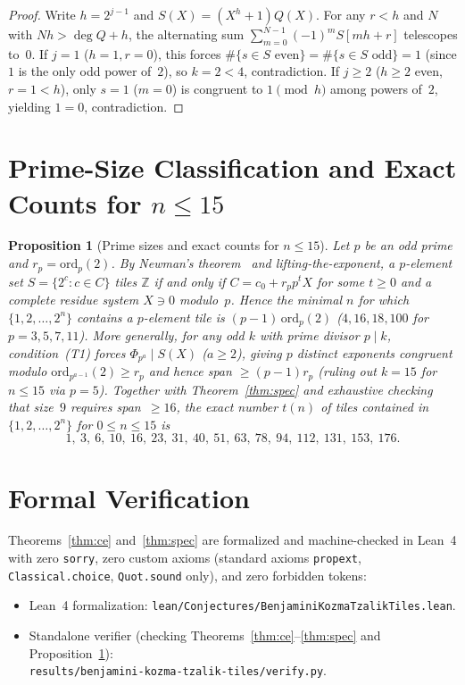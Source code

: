 \documentclass[11pt]{article}
\newtheorem{proposition}{Proposition}
\begin{document}
\begin{proof}
Write $h = 2^{j-1}$ and $S(X) = (X^h + 1) Q(X)$. For any $r < h$ and $N$ with $Nh > \deg Q + h$, the alternating sum $\sum_{m=0}^{N-1} (-1)^m S[mh + r]$ telescopes to~$0$. If $j = 1$ ($h = 1, r = 0$), this forces $\#\{s \in S \text{ even}\} = \#\{s \in S \text{ odd}\} = 1$ (since $1$ is the only odd power of~$2$), so $k = 2 < 4$, contradiction. If $j \ge 2$ ($h \ge 2$ even, $r = 1 < h$), only $s = 1$ ($m = 0$) is congruent to $1 \pmod{h}$ among powers of~$2$, yielding $1 = 0$, contradiction.
\end{proof}

\section{Prime-Size Classification and Exact Counts for \texorpdfstring{$n \le 15$}{n <= 15}}

\begin{proposition}[Prime sizes and exact counts for $n \le 15$]\label{prop:prime}
Let $p$ be an odd prime and $r_p = \mathrm{ord}_p(2)$. By Newman's theorem~\cite{Newman1977} and lifting-the-exponent, a $p$-element set $S = \{2^c : c \in C\}$ tiles $\mathbb{Z}$ if and only if $C = c_0 + r_p p^t X$ for some $t \ge 0$ and a complete residue system $X \ni 0$ modulo~$p$. Hence the minimal $n$ for which $\{1, 2, \dots, 2^n\}$ contains a $p$-element tile is $(p - 1)\,\mathrm{ord}_p(2)$ ($4, 16, 18, 100$ for $p = 3, 5, 7, 11$). More generally, for any odd $k$ with prime divisor $p \mid k$, condition~(T1) forces $\Phi_{p^a} \mid S(X)$ ($a \ge 2$), giving $p$ distinct exponents congruent modulo $\mathrm{ord}_{p^{a-1}}(2) \ge r_p$ and hence span $\ge (p - 1) r_p$ (ruling out $k = 15$ for $n \le 15$ via $p = 5$). Together with Theorem~\ref{thm:spec} and exhaustive checking that size~$9$ requires span~$\ge 16$, the exact number $t(n)$ of tiles contained in $\{1, 2, \dots, 2^n\}$ for $0 \le n \le 15$ is
\[
1,\ 3,\ 6,\ 10,\ 16,\ 23,\ 31,\ 40,\ 51,\ 63,\ 78,\ 94,\ 112,\ 131,\ 153,\ 176.
\]
\end{proposition}

\section{Formal Verification}

Theorems~\ref{thm:ce} and~\ref{thm:spec} are formalized and machine-checked in Lean~4 with zero \texttt{sorry}, zero custom axioms (standard axioms \texttt{propext}, \texttt{Classical.choice}, \texttt{Quot.sound} only), and zero forbidden tokens:
\begin{itemize}
\item Lean~4 formalization: \texttt{lean/Conjectures/BenjaminiKozmaTzalikTiles.lean}.
\item Standalone verifier (checking Theorems~\ref{thm:ce}--\ref{thm:spec} and Proposition~\ref{prop:prime}):\\
\texttt{results/benjamini-kozma-tzalik-tiles/verify.py}.
\end{itemize}
\end{document}
